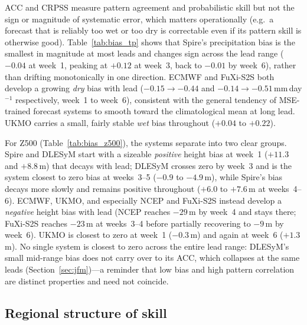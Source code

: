 \documentclass[11pt,a4paper]{article}
\begin{document}
ACC and CRPSS measure pattern agreement and probabilistic skill but not the
sign or magnitude of systematic error, which matters operationally (e.g.\ a
forecast that is reliably too wet or too dry is correctable even if its
pattern skill is otherwise good). Table~\ref{tab:bias_tp} shows that Spire's
precipitation bias is the smallest in magnitude at most leads and changes sign
across the lead range ($-0.04$ at week~1, peaking at $+0.12$ at week~3, back
to $-0.01$ by week~6), rather than drifting monotonically in one direction.
ECMWF and FuXi-S2S both develop a growing \emph{dry} bias with lead
($-0.15\to-0.44$ and $-0.14\to-0.51$\,mm\,day$^{-1}$ respectively, week~1 to
week~6), consistent with the general tendency of MSE-trained forecast systems
to smooth toward the climatological mean at long lead. UKMO carries a small,
fairly stable \emph{wet} bias throughout ($+0.04$ to $+0.22$).

For Z500 (Table~\ref{tab:bias_z500}), the systems separate into two clear
groups. Spire and DLESyM start with a sizeable \emph{positive} height bias at
week~1 ($+11.3$ and $+8.8$\,m) that decays with lead; DLESyM crosses zero by
week~3 and is the system closest to zero bias at weeks~3--5 ($-0.9$ to
$-4.9$\,m), while Spire's bias decays more slowly and remains positive
throughout ($+6.0$ to $+7.6$\,m at weeks~4--6). ECMWF, UKMO, and especially
NCEP and FuXi-S2S instead develop a \emph{negative} height bias with lead
(NCEP reaches $-29$\,m by week~4 and stays there; FuXi-S2S reaches
$-23$\,m at weeks~3--4 before partially recovering to $-9$\,m by week~6).
UKMO is closest to zero at week~1 ($-0.3$\,m) and again at week~6 ($+1.3$\,m).
No single system is closest to zero across the entire lead range: DLESyM's
small mid-range bias does not carry over to its ACC, which collapses at the
same leads (Section~\ref{sec:jfm})---a reminder that low bias and high
pattern correlation are distinct properties and need not coincide.



\subsection{Regional structure of skill}\label{sec:regional}
\end{document}
